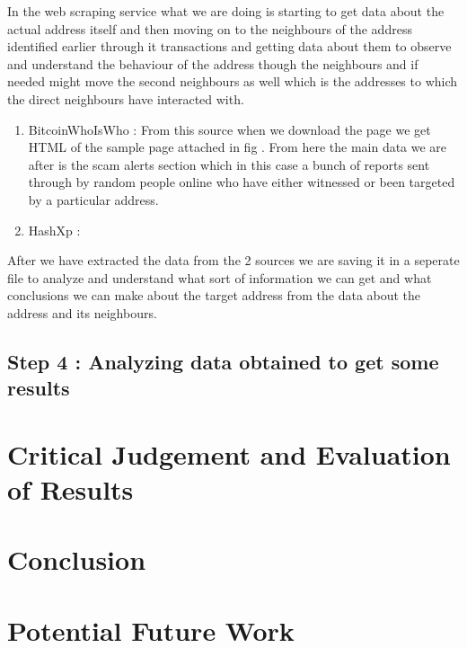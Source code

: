 \documentclass{article}
\begin{document}
        In the web scraping service what we are doing is starting to get data about the actual address itself and then moving on to the neighbours of the address identified earlier through it transactions and getting data about them to observe and understand the behaviour of the address though the neighbours and if needed might move the second neighbours as well which is the addresses to which the direct neighbours have interacted with.
        \begin{enumerate}
            \item BitcoinWhoIsWho : From this source when we download the page we get HTML of the sample page attached in fig \cite{} . From here the main data we are after is the scam alerts section which in this case a bunch of reports sent through by random people online who have either witnessed or been targeted by a particular address. 
            \item HashXp : 
        \end{enumerate}
        
        After we have extracted the data from the 2 sources we are saving it in a seperate file to analyze and understand what sort of information we can get and what conclusions we can make about the target address from the data about the address and its neighbours.
        
    \subsection{Step 4 : Analyzing data obtained to get some results}
        
\pagebreak
\section{Critical Judgement and Evaluation of Results}
\pagebreak
\section{Conclusion}
\pagebreak
\section{Potential Future Work}
\pagebreak

 
\end{document}
